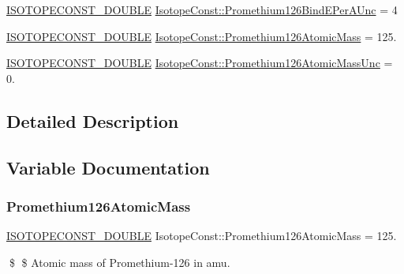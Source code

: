 \begin{DoxyCompactItemize}
\mbox{\hyperlink{group___isotope_const-_macros_ga8f45a7272ce02c0b4c65c44636ed719a}{I\+S\+O\+T\+O\+P\+E\+C\+O\+N\+S\+T\+\_\+\+D\+O\+U\+B\+LE}} \mbox{\hyperlink{group___isotope_const-_promethium-_pm126_ga952ed37ff5b2f16b8f6b14ff6d071575}{Isotope\+Const\+::\+Promethium126\+Bind\+E\+Per\+A\+Unc}} = 4
\item 
\mbox{\hyperlink{group___isotope_const-_macros_ga8f45a7272ce02c0b4c65c44636ed719a}{I\+S\+O\+T\+O\+P\+E\+C\+O\+N\+S\+T\+\_\+\+D\+O\+U\+B\+LE}} \mbox{\hyperlink{group___isotope_const-_promethium-_pm126_ga3f13133838b68c46041699603b3bebf9}{Isotope\+Const\+::\+Promethium126\+Atomic\+Mass}} = 125.
\item 
\mbox{\hyperlink{group___isotope_const-_macros_ga8f45a7272ce02c0b4c65c44636ed719a}{I\+S\+O\+T\+O\+P\+E\+C\+O\+N\+S\+T\+\_\+\+D\+O\+U\+B\+LE}} \mbox{\hyperlink{group___isotope_const-_promethium-_pm126_ga245501e61fdfec73ab9dd66c2bc2285b}{Isotope\+Const\+::\+Promethium126\+Atomic\+Mass\+Unc}} = 0.
\end{DoxyCompactItemize}


\subsection{Detailed Description}


\subsection{Variable Documentation}
\mbox{\label{group___isotope_const-_promethium-_pm126_ga3f13133838b68c46041699603b3bebf9}} 
\subsubsection{\texorpdfstring{Promethium126\+Atomic\+Mass}{Promethium126AtomicMass}}
{\footnotesize\ttfamily \mbox{\hyperlink{group___isotope_const-_macros_ga8f45a7272ce02c0b4c65c44636ed719a}{I\+S\+O\+T\+O\+P\+E\+C\+O\+N\+S\+T\+\_\+\+D\+O\+U\+B\+LE}} Isotope\+Const\+::\+Promethium126\+Atomic\+Mass = 125.}

\$ \$ Atomic mass of Promethium-\/126 in amu. \mbox{\label{group___isotope_const-_promethium-_pm126_ga245501e61fdfec73ab9dd66c2bc2285b}} 
